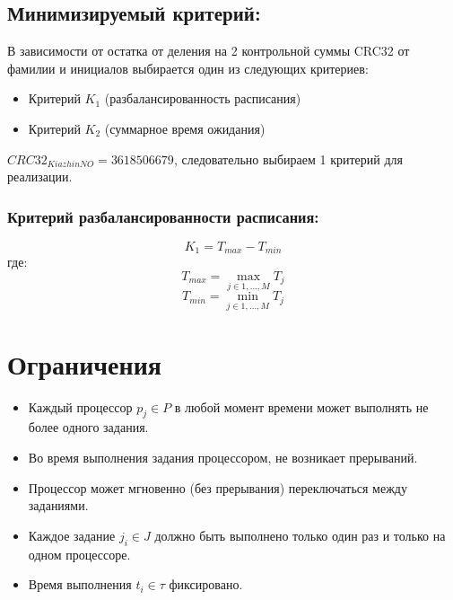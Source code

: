 \documentclass[openany, twoside, a4paper, 12pt]{extbook}
\begin{document}
    \subsection*{Минимизируемый критерий:}
        В зависимости от остатка от деления на 2 контрольной суммы CRC32 от фамилии и инициалов выбирается один из следующих критериев:
        \begin{itemize}
            \item Критерий $K_1$ (разбалансированность расписания)
            \item Критерий $K_2$ (суммарное время ожидания)
        \end{itemize}
        
        $CRC32_{KiazhinNO} = 3618506679$, следовательно выбираем 1 критерий для реализации.

        \subsubsection*{Критерий разбалансированности расписания:}

        \begin{equation}
            K_1 = T_{max} - T_{min}
        \end{equation}
        где:
        \begin{equation}
            T_{max}= \max_{j \in {1, \dots, M}}T_j
        \end{equation}
        \begin{equation}
            T_{min} = \min_{j \in {1, \dots, M}}T_j
        \end{equation}
        
\section*{Ограничения}

    \begin{itemize}
        \item Каждый процессор $p_j \in P$ в любой момент времени может выполнять не более одного задания.
        \item Во время выполнения задания процессором, не возникает прерываний.
        \item Процессор может мгновенно (без прерывания) переключаться между заданиями.
        \item Каждое задание $j_i \in J$ должно быть выполнено только один раз и только на одном процессоре.
        \item Время выполнения $t_i \in \tau$ фиксировано.
    \end{itemize}
\end{document}
